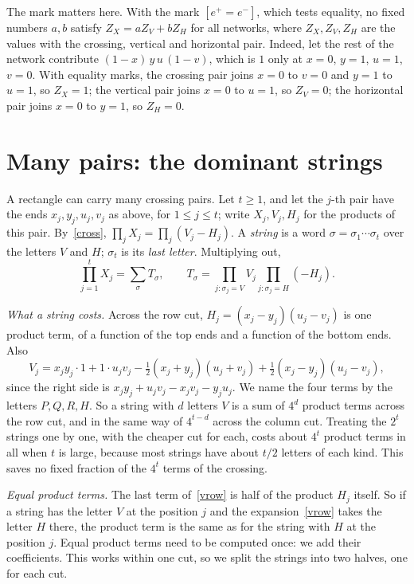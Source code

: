 \documentclass[11pt]{article}
\begin{document}
The mark matters here. With the mark $[e^+=e^-]$, which tests equality, no fixed numbers $a,b$ satisfy $Z_X=aZ_V+bZ_H$ for all networks, where $Z_X,Z_V,Z_H$ are the values with the crossing, vertical and horizontal pair. Indeed, let the rest of the network contribute $(1-x)\,y\,u\,(1-v)$, which is $1$ only at $x=0$, $y=1$, $u=1$, $v=0$. With equality marks, the crossing pair joins $x=0$ to $v=0$ and $y=1$ to $u=1$, so $Z_X=1$; the vertical pair joins $x=0$ to $u=1$, so $Z_V=0$; the horizontal pair joins $x=0$ to $y=1$, so $Z_H=0$.

\section{Many pairs: the dominant strings}\label{sec:dom}

A rectangle can carry many crossing pairs. Let $t\ge1$, and let the $j$-th pair have the ends $x_j,y_j,u_j,v_j$ as above, for $1\le j\le t$; write $X_j,V_j,H_j$ for the products of this pair. By~\eqref{cross}, $\prod_jX_j=\prod_j(V_j-H_j)$. A \emph{string} is a word $\sigma=\sigma_1\cdots\sigma_t$ over the letters $V$ and $H$; $\sigma_t$ is its \emph{last letter}. Multiplying out,
\[
\prod_{j=1}^tX_j=\sum_\sigma T_\sigma,\qquad T_\sigma=\prod_{j:\sigma_j=V}V_j\prod_{j:\sigma_j=H}(-H_j).
\]

\emph{What a string costs.} Across the row cut, $H_j=(x_j-y_j)(u_j-v_j)$ is one product term, of a function of the top ends and a function of the bottom ends. Also
\begin{equation}\label{vrow}
V_j=x_jy_j\cdot1+1\cdot u_jv_j-\tfrac12(x_j+y_j)(u_j+v_j)+\tfrac12(x_j-y_j)(u_j-v_j),
\end{equation}
since the right side is $x_jy_j+u_jv_j-x_jv_j-y_ju_j$. We name the four terms by the letters $P,Q,R,H$. So a string with $d$ letters $V$ is a sum of $4^d$ product terms across the row cut, and in the same way of $4^{t-d}$ across the column cut. Treating the $2^t$ strings one by one, with the cheaper cut for each, costs about $4^t$ product terms in all when $t$ is large, because most strings have about $t/2$ letters of each kind. This saves no fixed fraction of the $4^t$ terms of the crossing.

\emph{Equal product terms.} The last term of~\eqref{vrow} is half of the product $H_j$ itself. So if a string has the letter $V$ at the position $j$ and the expansion~\eqref{vrow} takes the letter $H$ there, the product term is the same as for the string with $H$ at the position $j$. Equal product terms need to be computed once: we add their coefficients. This works within one cut, so we split the strings into two halves, one for each cut.
\end{document}
